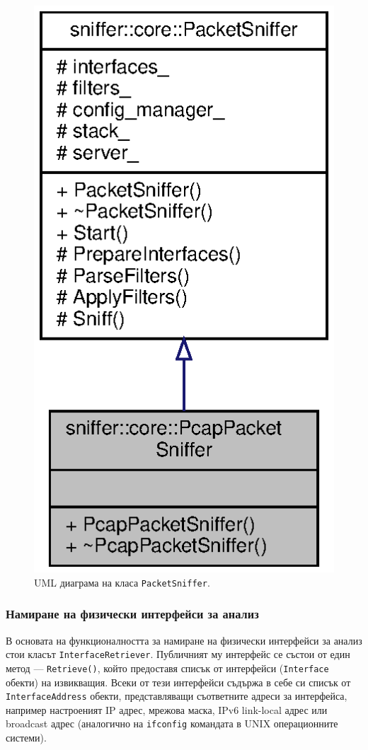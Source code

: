 \documentclass[12pt,a4paper,oneside]{book}
\begin{document}
\begin{figure}[h!]
  \centering
  \includegraphics[scale=.7]{figures/packet_sniffer_uml.eps}
  \caption{UML диаграма на класа \texttt{PacketSniffer}.}
  \label{packet_sniffer_uml_fig}
\end{figure}

\subsubsection{Намиране на физически интерфейси за анализ}

В основата на функционалността за намиране на физически интерфейси за анализ
стои класът \texttt{InterfaceRetriever}. Публичният му интерфейс се състои от
един метод --- \texttt{Retrieve()}, който предоставя списък от интерфейси
(\texttt{Interface} обекти) на извикващия. Всеки от тези интерфейси съдържа в
себе си списък от \texttt{InterfaceAddress} обекти, представляващи съответните
адреси за интерфейса, например настроеният IP адрес, мрежова маска, IPv6
link-local адрес или broadcast адрес (аналогично на \texttt{ifconfig} командата
в UNIX операционните системи).
\end{document}
